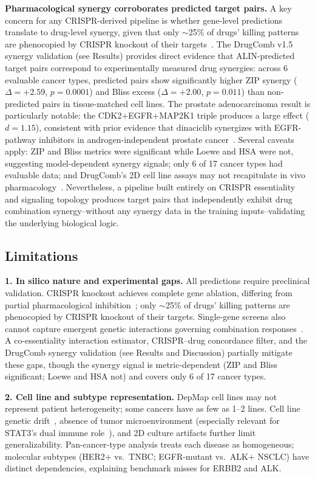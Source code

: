 \documentclass[11pt]{article}
\begin{document}
\textbf{Pharmacological synergy corroborates predicted target pairs.} A key concern for any CRISPR-derived pipeline is whether gene-level predictions translate to drug-level synergy, given that only $\sim$25\% of drugs' killing patterns are phenocopied by CRISPR knockout of their targets~\cite{Lin2017,Goncalves2020}. The DrugComb v1.5 synergy validation (see Results) provides direct evidence that ALIN-predicted target pairs correspond to experimentally measured drug synergies: across 6 evaluable cancer types, predicted pairs show significantly higher ZIP synergy ($\Delta = +2.59$, $p = 0.0001$) and Bliss excess ($\Delta = +2.00$, $p = 0.011$) than non-predicted pairs in tissue-matched cell lines. The prostate adenocarcinoma result is particularly notable: the CDK2+EGFR+MAP2K1 triple produces a large effect ($d = 1.15$), consistent with prior evidence that dinaciclib synergizes with EGFR-pathway inhibitors in androgen-independent prostate cancer~\cite{Nabhan2009}. Several caveats apply: ZIP and Bliss metrics were significant while Loewe and HSA were not, suggesting model-dependent synergy signals; only 6 of 17 cancer types had evaluable data; and DrugComb's 2D cell line assays may not recapitulate in vivo pharmacology~\cite{Zagidullin2019}. Nevertheless, a pipeline built entirely on CRISPR essentiality and signaling topology produces target pairs that independently exhibit drug combination synergy--without any synergy data in the training inputs--validating the underlying biological logic.

\subsection*{Limitations}

\textbf{1. In silico nature and experimental gaps.} All predictions require preclinical validation. CRISPR knockout achieves complete gene ablation, differing from partial pharmacological inhibition~\cite{Lin2017,Goncalves2020}; only $\sim$25\% of drugs' killing patterns are phenocopied by CRISPR knockout of their targets. Single-gene screens also cannot capture emergent genetic interactions governing combination responses~\cite{Norman2019,Shen2017combCRISPR}. A co-essentiality interaction estimator, CRISPR--drug concordance filter, and the DrugComb synergy validation (see Results and Discussion) partially mitigate these gaps, though the synergy signal is metric-dependent (ZIP and Bliss significant; Loewe and HSA not) and covers only 6 of 17 cancer types.

\textbf{2. Cell line and subtype representation.} DepMap cell lines may not represent patient heterogeneity; some cancers have as few as 1--2 lines. Cell line genetic drift~\cite{BenDavid2018}, absence of tumor microenvironment (especially relevant for STAT3's dual immune role~\cite{Yu2009STAT3immunity,Kortylewski2005}), and 2D culture artifacts further limit generalizability. Pan-cancer-type analysis treats each disease as homogeneous; molecular subtypes (HER2+ vs.\ TNBC; EGFR-mutant vs.\ ALK+ NSCLC) have distinct dependencies, explaining benchmark misses for ERBB2 and ALK.
\end{document}
